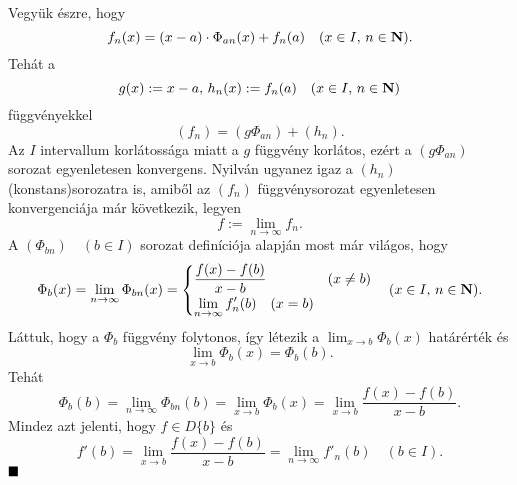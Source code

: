 Vegyük észre, hogy
\[
	f_n(x) = (x-a) \cdot \Phi_{an}(x) + f_n(a) \quad (x \in I, \, n \in \mathbf{N}).
\]
Tehát a
\[
	g(x) := x-a, \, h_n(x) := f_n(a) \quad (x \in I, \, n \in \mathbf{N})
\]
függvényekkel
\[
	(f_n) = (g \Phi_{an}) + (h_n).
\]
Az $I$ intervallum korlátossága miatt a $g$ függvény korlátos, ezért a $(g \Phi_{an})$ sorozat egyenletesen konvergens. Nyilván ugyanez igaz a $(h_n)$ (konstans)sorozatra is, amiből az $(f_n)$ függvénysorozat egyenletesen konvergenciája már következik, legyen
\[
	f := \lim_{n \to \infty} f_n.
\]
A $(\Phi_{bn}) \quad (b \in I)$ sorozat definíciója alapján most már világos, hogy
\[
	\Phi_b(x) = \lim_{n \to \infty} \Phi_{bn}(x) = \begin{cases}
		\displaystyle \frac{f(x) - f(b)}{x-b} & (x \neq b) \\
		\displaystyle \lim_{n \to \infty} f'_n(b) \quad (x = b)
	\end{cases} \quad (x \in I, \, n \in \mathbf{N}).
\]
Láttuk, hogy a $\Phi_b$ függvény folytonos, így létezik a $\displaystyle \lim_{x \to b} \Phi_b(x)$ határérték és
\[
	\lim_{x \to b} \Phi_b(x) = \Phi_b(b).
\]
Tehát
\[
	\Phi_b(b) = \lim_{n \to \infty}\Phi_{bn}(b) = \lim_{x \to b} \Phi_b(x) = \lim_{x \to b} \frac{f(x) - f(b)}{x -b }.
\]
Mindez azt jelenti, hogy $f \in D\{b\}$ és
\[
	f'(b) = \lim_{x \to b} \frac{f(x) - f(b)}{x-b} = \lim_{n \to \infty} f'_n(b) \quad (b \in I).
\]
$\hfill \blacksquare$